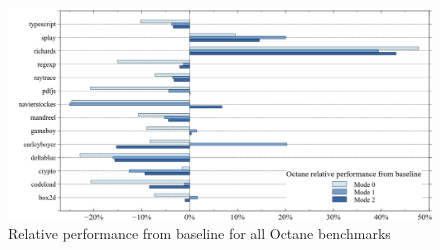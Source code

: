 \begin{figure}[ht]
  \begin{center}
    \centering
    \includegraphics[width=1.0\textwidth]{figures/octane_variation.png}
    \caption{Relative performance from baseline for all Octane benchmarks}
    \label{f:octane_variation}
  \end{center}
\end{figure}
\clearpage

